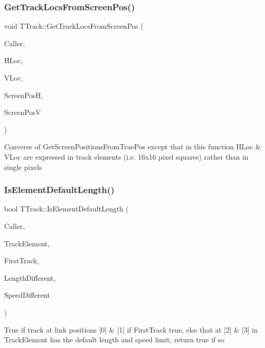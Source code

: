 \subsubsection{\texorpdfstring{Get\+Track\+Locs\+From\+Screen\+Pos()}{GetTrackLocsFromScreenPos()}}
{\footnotesize\ttfamily void T\+Track\+::\+Get\+Track\+Locs\+From\+Screen\+Pos (\begin{DoxyParamCaption}\item[{int}]{Caller,  }\item[{int \&}]{H\+Loc,  }\item[{int \&}]{V\+Loc,  }\item[{int}]{Screen\+PosH,  }\item[{int}]{Screen\+PosV }\end{DoxyParamCaption})}

Converse of Get\+Screen\+Positions\+From\+True\+Pos except that in this function H\+Loc \& V\+Loc are expressed in track elements (i.\+e. 16x16 pixel squares) rather than in single pixels \mbox{\label{class_t_track_a9519d6fa40b71bfcad4d5383634d73dd}} 
\subsubsection{\texorpdfstring{Is\+Element\+Default\+Length()}{IsElementDefaultLength()}}
{\footnotesize\ttfamily bool T\+Track\+::\+Is\+Element\+Default\+Length (\begin{DoxyParamCaption}\item[{int}]{Caller,  }\item[{\mbox{\hyperlink{class_t_track_element}{T\+Track\+Element}} \&}]{Track\+Element,  }\item[{bool}]{First\+Track,  }\item[{bool \&}]{Length\+Different,  }\item[{bool \&}]{Speed\+Different }\end{DoxyParamCaption})}

True if track at link positions \mbox{[}0\mbox{]} \& \mbox{[}1\mbox{]} if First\+Track true, else that at \mbox{[}2\mbox{]} \& \mbox{[}3\mbox{]} in Track\+Element has the default length and speed limit, return true if so \mbox{\label{class_t_track_a17b6095b0c8de0e1493eeebd6d534247}} 
